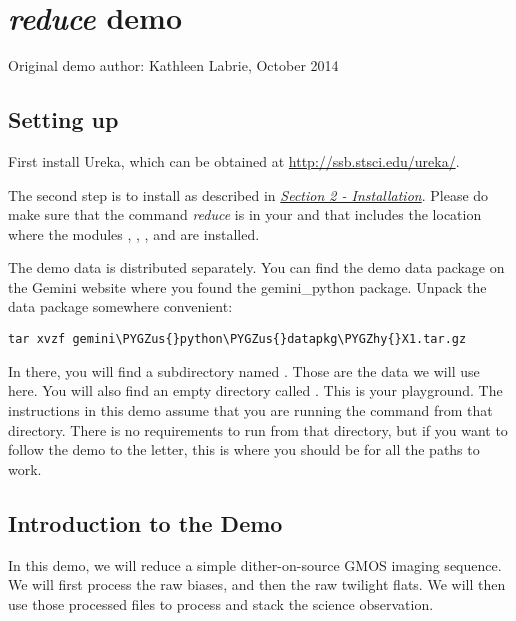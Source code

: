 \documentclass[letterpaper,10pt,english]{sphinxmanual}
\def\PYGZus{\char`\_}
\def\PYGZhy{\char`\-}
\begin{document}
\chapter{\emph{reduce} demo}
\label{appendices/appendix_demo::doc}\label{appendices/appendix_demo:reduce-demo}
Original demo author: Kathleen Labrie, October 2014


\section{Setting up}
\label{appendices/appendix_demo:setting-up}
First install Ureka, which can be obtained at \href{http://ssb.stsci.edu/ureka/}{http://ssb.stsci.edu/ureka/}.

The second step is to install  as described in
{\hyperref[userenv:config]{\emph{Section 2 - Installation}}}.
Please do make sure that the command \emph{reduce} is in your  and that
 includes the location where the modules , ,
, and  are installed.

The demo data is distributed separately.  You can find the demo data package
 on the Gemini website where you found the
gemini\_python package.  Unpack the data package somewhere convenient:

\begin{Verbatim}[commandchars=\\\{\}]
tar xvzf gemini\PYGZus{}python\PYGZus{}datapkg\PYGZhy{}X1.tar.gz
\end{Verbatim}

In there, you will find a subdirectory named .  Those are
the data we will use here.  You will also find an empty directory called
.  This is your playground. The instructions in this demo assume that
you are running the  command from that directory.  There is no requirements
to run  from that directory, but if you want to follow the demo to the
letter, this is where you should be for all the paths to work.


\section{Introduction to the Demo}
\label{appendices/appendix_demo:introduction-to-the-demo}
In this demo, we will reduce a simple dither-on-source GMOS imaging sequence.
We will first process the raw biases, and then the raw twilight flats.  We will
then use those processed files to process and stack the science observation.
\end{document}
